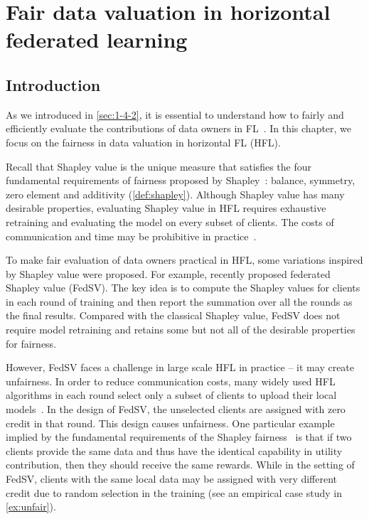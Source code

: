 \chapter{Fair data valuation in horizontal federated learning}
\label{ch:Val-HFL}

\section{Introduction} \label{sec:7-1}

As we introduced in \autoref{sec:1-4-2}, it is essential to understand how to fairly and efficiently evaluate the contributions of data owners in FL~\cite{zhang2020hierarchically,song2019profit,wei2020efficient,wang2020principled}. In this chapter, we focus on the fairness in data valuation in horizontal FL (HFL). 

Recall that Shapley value is the unique measure that satisfies the four fundamental requirements of fairness proposed by Shapley~\cite{shapley201617}: balance, symmetry, zero element and additivity (\autoref{def:shapley}). Although Shapley value has many desirable properties, evaluating Shapley value in HFL requires exhaustive retraining and evaluating the model on every subset of clients. The costs of communication and time may be prohibitive in practice~\cite{song2019profit}.

To make fair evaluation of data owners practical in HFL, some variations inspired by Shapley value were proposed. For example, \citet{wang2020principled} recently proposed federated Shapley value (FedSV). The key idea is to compute the Shapley values for clients in each round of training and then report the summation over all the rounds as the final results. Compared with the classical Shapley value, FedSV does not require model retraining and retains some but not all of the desirable properties for fairness. 

However, FedSV faces a challenge in large scale HFL in practice -- it may create unfairness.  In order to reduce communication costs, many widely used HFL algorithms in each round select only a subset of clients to upload their local models~\cite{mcmahan2017communication, nishio2019client}. In the design of FedSV, the unselected clients are assigned with zero credit in that round. This design causes unfairness. One particular example implied by the fundamental requirements of the Shapley fairness~\cite{shapley201617} is that if two clients provide the same data and thus have the identical capability in utility contribution, then they should receive the same rewards. While in the setting of FedSV, clients with the same local data may be assigned with very different credit due to random selection in the training (see an empirical case study in \autoref{ex:unfair}). 

